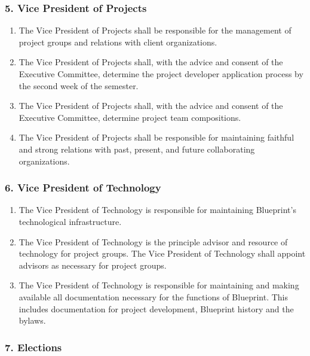 \documentclass[
]{article}
\providecommand{\tightlist}{%
  \setlength{\itemsep}{0pt}\setlength{\parskip}{0pt}}
\begin{document}
\hypertarget{vice-president-of-projects}{%
\subsubsection{5. Vice President of
Projects}\label{vice-president-of-projects}}

\begin{enumerate}
\def\labelenumi{\arabic{enumi}.}
\tightlist
\item
  The Vice President of Projects shall be responsible for the management
  of project groups and relations with client organizations.
\item
  The Vice President of Projects shall, with the advice and consent of
  the Executive Committee, determine the project developer application
  process by the second week of the semester.
\item
  The Vice President of Projects shall, with the advice and consent of
  the Executive Committee, determine project team compositions.
\item
  The Vice President of Projects shall be responsible for maintaining
  faithful and strong relations with past, present, and future
  collaborating organizations.
\end{enumerate}

\hypertarget{vice-president-of-technology}{%
\subsubsection{6. Vice President of
Technology}\label{vice-president-of-technology}}

\begin{enumerate}
\def\labelenumi{\arabic{enumi}.}
\tightlist
\item
  The Vice President of Technology is responsible for maintaining
  Blueprint's technological infrastructure.
\item
  The Vice President of Technology is the principle advisor and resource
  of technology for project groups. The Vice President of Technology
  shall appoint advisors as necessary for project groups.
\item
  The Vice President of Technology is responsible for maintaining and
  making available all documentation necessary for the functions of
  Blueprint. This includes documentation for project development,
  Blueprint history and the bylaws.
\end{enumerate}

\hypertarget{elections}{%
\subsubsection{7. Elections}\label{elections}}
\end{document}
